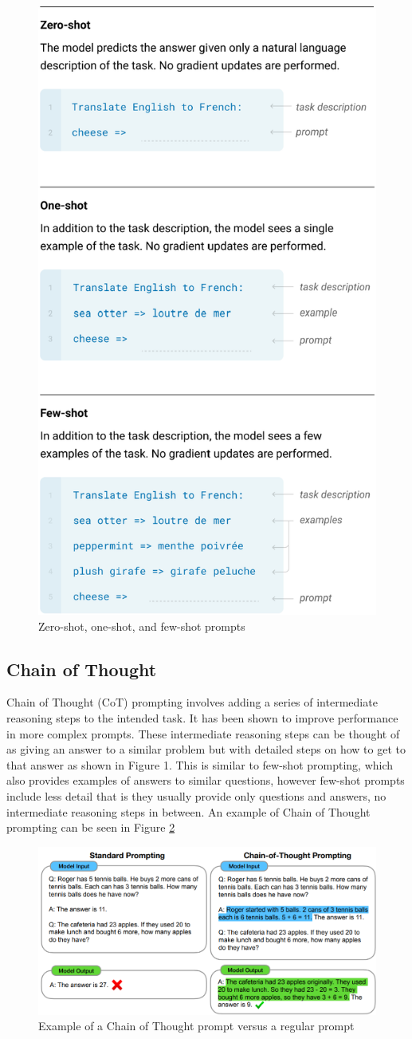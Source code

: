 \documentclass[fleqn,moreauthors,10pt]{ds_report}
\begin{document}
\begin{figure}[!h]
    \centering
    \includegraphics[width=0.6\linewidth]{fig/few-shot-new.png}
    \caption{Zero-shot, one-shot, and few-shot prompts}
    \label{fig:few-shot}
\end{figure}


\subsection*{Chain of Thought}
Chain of Thought (CoT) \cite{CoT} prompting involves adding a series of intermediate reasoning steps to the intended task. It has been shown to improve performance in more complex prompts.
These intermediate reasoning steps can be thought of as giving an answer to a similar problem but with detailed steps on how to get to that answer as shown in Figure 1. This is similar to few-shot prompting, which also provides examples of answers to similar questions, however few-shot prompts include less detail that is they usually provide only questions and answers, no intermediate reasoning steps in between. \cite{CoT}
An example of Chain of Thought prompting can be seen in Figure \ref{fig:cot}
\begin{figure}[!h]\centering
	\includegraphics[width=0.8\linewidth]{Example_CoT.png}
	\caption{Example of a Chain of Thought prompt versus a regular prompt}
	\label{fig:cot}
\end{figure}
\end{document}
